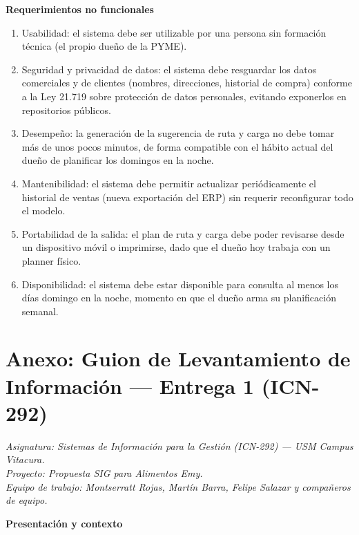 \documentclass[10pt,a4paper]{article}
\begin{document}
\textbf{Requerimientos no funcionales}

\begin{enumerate}[leftmargin=1.5cm, itemsep=0.4em]
    \item Usabilidad: el sistema debe ser utilizable por una persona sin formación técnica (el propio dueño de la PYME).
    \item Seguridad y privacidad de datos: el sistema debe resguardar los datos comerciales y de clientes (nombres, direcciones, historial de compra) conforme a la Ley 21.719 sobre protección de datos personales, evitando exponerlos en repositorios públicos.
    \item Desempeño: la generación de la sugerencia de ruta y carga no debe tomar más de unos pocos minutos, de forma compatible con el hábito actual del dueño de planificar los domingos en la noche.
    \item Mantenibilidad: el sistema debe permitir actualizar periódicamente el historial de ventas (nueva exportación del ERP) sin requerir reconfigurar todo el modelo.
    \item Portabilidad de la salida: el plan de ruta y carga debe poder revisarse desde un dispositivo móvil o imprimirse, dado que el dueño hoy trabaja con un planner físico.
    \item Disponibilidad: el sistema debe estar disponible para consulta al menos los días domingo en la noche, momento en que el dueño arma su planificación semanal.

\end{enumerate}


\newpage
\section*{Anexo: Guion de Levantamiento de Información — Entrega 1 (ICN-292)}

\textit{Asignatura: Sistemas de Información para la Gestión (ICN-292) — USM Campus Vitacura.} \\
\textit{Proyecto: Propuesta SIG para Alimentos Emy.} \\
\textit{Equipo de trabajo: Montserratt Rojas, Martín Barra, Felipe Salazar y compañeros de equipo.}

\vspace{0.3cm}

\textbf{Presentación y contexto}
\end{document}
